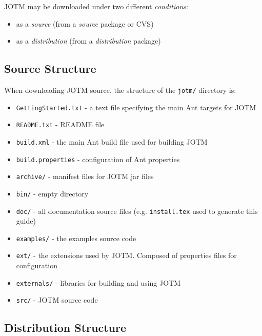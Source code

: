 \documentclass[a4paper,11pt]{article}
\begin{document}
JOTM may be downloaded under two different \emph{conditions}:
\begin{itemize}
\item as a \emph{source} (from a \emph{source} package or CVS)
\item as a \emph{distribution} (from a \emph{distribution} package)
\end{itemize}

\subsection{Source Structure}
\label{sec:source_desc}

When downloading JOTM source, the structure of the \texttt{jotm/}
directory is:
\begin{itemize}
\item \texttt{GettingStarted.txt} - a text file specifying the main Ant targets
  for JOTM
\item \texttt{README.txt} - README file
\item \texttt{build.xml} - the main Ant build file used for building JOTM
\item \texttt{build.properties} - configuration of Ant properties 
\item \texttt{archive/} - manifest files for JOTM jar files 
\item \texttt{bin/} - empty directory 
\item \texttt{doc/} - all documentation source files
  (e.g. \texttt{install.tex} used to generate this guide)
\item \texttt{examples/} - the examples source code
\item \texttt{ext/} - the extensions used by JOTM. 
  Composed of properties files for configuration
\item \texttt{externals/} - libraries for building and using JOTM
\item \texttt{src/} - JOTM source code

\end{itemize}

\subsection{Distribution Structure}
\label{sec:dist_desc}
\end{document}
